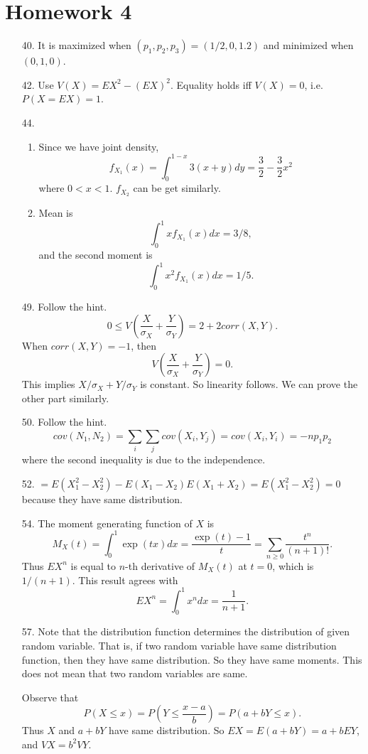 \documentclass{article}
\begin{document}
\section*{Homework 4}
\begin{enumerate}
	\item[40.]
		It is maximized when $(p_1, p_2, p_3) = (1/2, 0, 1.2)$ and minimized when $(0, 1, 0)$.

	\item[42.]
		Use $V(X) = EX^2 - (EX)^2$.
		Equality holds iff $V(X) = 0$, i.e. $P(X = EX) = 1$.

	\item[44.]
		\begin{enumerate}[label = (\alph*)]
			\item Since we have joint density,
				\[
					f_{X_1}(x) = \int_{0}^{1-x}3(x+y)dy = \frac{3}{2} - \frac{3}{2}x^2
				\]
				where $0<x<1$.
				$f_{X_2}$ can be get similarly.

			\item Mean is
				\[
					\int_0^1 xf_{X_1}(x) dx = 3/8,
				\]
				and the second moment is
				\[
					\int_0^1 x^2 f_{X_1}(x) dx = 1/5.
				\]
		\end{enumerate}

	\item[49.]
		Follow the hint.
		\[
			0\le V\left (\frac{X}{\sigma_X} + \frac{Y}{\sigma_Y} \right ) = 2+2corr(X,Y).
		\]
		When $corr(X,Y) = -1$, then
		\[
			V\left( \frac{X}{\sigma_X} + \frac{Y}{\sigma_Y} \right) = 0.
		\]
		This implies $X/\sigma_X + Y/\sigma_Y$ is constant.
		So linearity follows.
		We can prove the other part similarly.

	\item[50.]
		Follow the hint.
		\[
			cov(N_1, N_2) = \sum_i \sum_j cov(X_i, Y_j) = cov(X_i, Y_i) = -np_1 p_2
		\]
		where the second inequality is due to the independence.

	\item[52.]
		$= E(X_1^2 - X_2^2) - E(X_1 - X_2)E(X_1 + X_2) = E(X_1^2 - X_2^2) = 0$
		because they have same distribution.

	\item[54.]
		The moment generating function of $X$ is
		\[
			M_X(t) = \int_0^1 \exp(tx) dx = \frac{\exp(t)-1}{t} = \sum_{n\ge 0} \frac{t^n}{(n+1)!}.
		\]
		Thus $EX^n$ is equal to $n$-th derivative of $M_X(t)$ at $t = 0$, which is $1/(n+1)$.
		This result agrees with
		\[
			EX^n = \int_0^1 x^n dx = \frac{1}{n+1}.
		\]

	\item[57.]
		Note that the distribution function determines the distribution of given random variable.
		That is, if two random variable have same distribution function, then they have same distribution.
		So they have same moments.
		This does not mean that two random variables are same.

		Observe that
		\[
			P(X \le x) = P(Y \le \frac{x-a}{b}) = P(a+bY \le x).
		\]
		Thus $X$ and $a+bY$ have same distribution.
		So $EX = E(a+bY) = a+bEY$, and $VX = b^2 VY$.
\end{enumerate}
\end{document}
